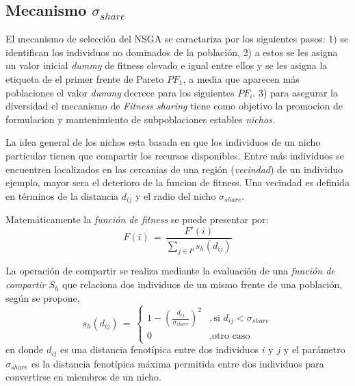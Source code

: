 \documentclass[10pt,onecolumn,twoside,letterpaper]{article}
\begin{document}
\begin{multicols}{2}
\section{Mecanismo $\sigma_{share}$}
\par El mecanismo de selecci\'on del NSGA se caractariza por los siguientes pasos: 1) se identifican los individuos no dominados de la poblaci\'on, 2) a estos se les asigna un valor inicial \emph{dummy} de fitness elevado e igual entre ellos y se les asigna la etiqueta de el primer frente de Pareto $PF_1$, a media que aparecen m\'as poblaciones el valor \emph{dummy} decrece para los siguientes $PF_i$. 3) para asegurar la diversidad el mecanismo de \emph{Fitness sharing} tiene como objetivo la promocion de formulacion y mantenimiento de subpoblaciones estables \emph{nichos}.
\par La idea general de los nichos esta basada en que los individuos de un nicho particular tienen que compartir los recursos disponibles. Entre m\'as individuos se encuentren localizados en las cercanias de una regi\'on (\emph{vecindad}) de un individuo ejemplo, mayor sera el deterioro de la funcion de fitness. Una vecindad es definida en t\'erminos de la distancia $d_{ij}$ y el radio del nicho $\sigma_{share}$.
\par Matem\'aticamente la \emph{funci\'on de fitness} se puede presentar por:
\begin{equation}
  \label{eq:share}
  F(i)\,=\,\frac{F'(i)}{\sum_{j\in P}s_h(d_{ij})}
\end{equation}
\par La operaci\'on de compartir se realiza mediante la evaluaci\'on de una \emph{funci\'on de compartir} $S_h$ que relaciona dos individuos de un mismo frente de una poblaci\'on, seg\'un \cite{SrinivasN.1994} se propone,
\begin{equation}
  \label{eq:share}
  s_h(d_{ij})\,=\,\left\{
    \begin{array}{cl}
      1-(\frac{d_{ij}}{\sigma_{share}})^2&,\text{si $d_{ij}<\sigma_{share}$}\\
      0&,\text{otro caso}
    \end{array}\right.
\end{equation}
en donde $d_{ij}$ es una distancia fenot\'ipica entre dos individuos $i$ y $j$ y el par\'ametro $\sigma_{share}$ es la distancia fenot\'ipica m\'axima permitida entre dos individuos para convertirse en miembros de un nicho.

\end{multicols}
\end{document}
